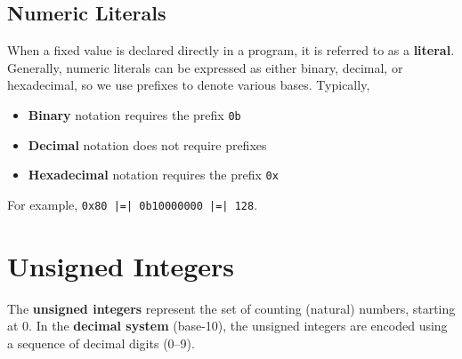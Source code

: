 \documentclass{report}
\begin{document}
\subsection{Numeric Literals}
When a fixed value is declared directly in a program, it is referred to as a \textbf{literal}.
Generally, numeric literals can be expressed as either binary, decimal, or hexadecimal, so we
use prefixes to denote various bases. Typically,
\begin{itemize}
    \item \textbf{Binary} notation requires the prefix \texttt{0b}
    \item \textbf{Decimal} notation does not require prefixes
    \item \textbf{Hexadecimal} notation requires the prefix \texttt{0x}
\end{itemize}
For example, \texttt{0x80 |=| 0b10000000 |=| 128}. %
\section{Unsigned Integers}
The \textbf{unsigned integers} represent the set of counting (natural) numbers, starting at 0.
In the \textbf{decimal system} (base-10), the unsigned integers are encoded using a sequence of decimal digits (0--9).
\end{document}
